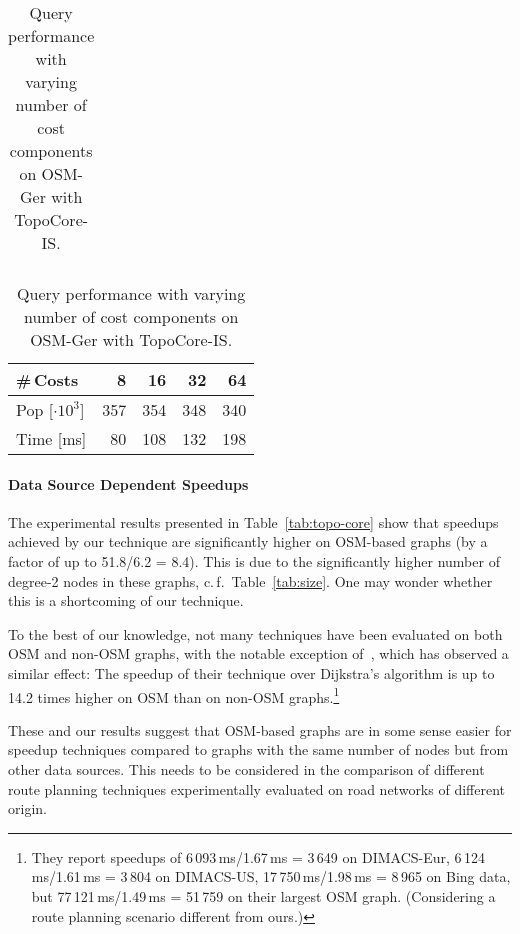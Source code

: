 \documentclass{sig-alternate}
\newcommand{\cf}{c.\,f.\xspace}
\begin{document}
\begin{table}
\begin{center}
{\begin{centering}
\begin{tabular}{llrrrr}
		\end{tabular}
		\par\end{centering}
	}
	\end{center}
\caption{\label{tab:cost-comp}Query performance with varying number of cost components on OSM-Ger with TopoCore-IS.}
\begin{centering}
\begin{tabular}{lrrrr}
\toprule
\#\,Costs &  8 & 16 & 32 & 64 \\
\midrule
Pop {[}$\cdot10^{3}${]} & 357 &  354 &348 & 340\\
Time [ms] & 80 & 108 & 132& 198 \\
\bottomrule
\end{tabular}
\par\end{centering}
\end{table}







\paragraph{Data Source Dependent Speedups}

The experimental results presented in Table~\ref{tab:topo-core} show that speedups achieved by our technique are significantly higher on OSM-based graphs (by a factor of up to 51.8/6.2 = 8.4). 
This is due to the significantly higher number of degree-2 nodes in these graphs, \cf~Table~\ref{tab:size}.
One may wonder whether this is a shortcoming of our technique. 

To the best of our knowledge, not many techniques have been evaluated on both OSM and non-OSM graphs, with the notable exception of~\cite{dgpw-crprn-13}, which has observed a similar effect: The speedup of their technique over Dijkstra's algorithm is up to 14.2 times higher on OSM than on non-OSM graphs.\footnote{They report speedups of 6\,093\,ms/1.67\,ms = 3\,649 on DIMACS-Eur, 6\,124\,ms/1.61\,ms = 3\,804 on DIMACS-US, 17\,750\,ms/1.98\,ms = 8\,965 on Bing data, but 77\,121\,ms/1.49\,ms = 51\,759 on their largest OSM graph. (Considering a route planning scenario different from ours.)}





These and our results suggest that OSM-based graphs are in some sense easier for speedup techniques compared to graphs with the same number of nodes but from other data sources. This needs to be considered in the comparison of different route planning techniques experimentally evaluated on road networks of different origin.
\end{document}
